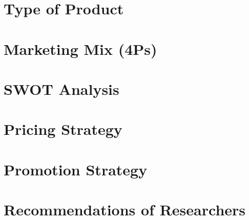 \documentclass[a4paper,12pt]{article}
\begin{document}
\section{Type of Product}

\newpage

\section{Marketing Mix (4Ps)}

\newpage

\section{SWOT Analysis}

\newpage

\section{Pricing Strategy}

\newpage

\section{Promotion Strategy}

\newpage

\section{Recommendations of Researchers}

\end{document}
